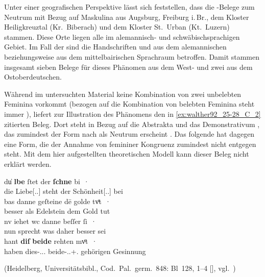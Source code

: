 Unter einer geografischen Perspektive lässt sich feststellen, dass die
-Belege zum Neutrum mit Bezug auf Maskulina aus Augsburg,
Freiburg i.\,Br., dem Kloster Heiligkreuztal (Kr.~Biberach) und dem Kloster
St.~Urban (Kt.~Luzern) stammen. Diese Orte liegen alle im alemannisch- und
schwäbischsprachigen Gebiet. Im Fall der \citet{kc} sind die Handschriften
\citet{kc:K} und \citet{kc:B1} aus dem alemannischen beziehungsweise aus dem
mittelbairischen Sprachraum betroffen. Damit stammen insgesamt sieben Belege
für dieses Phänomen aus dem West- und zwei aus dem Ost\-ober\-deutschen.

Während im untersuchten Material keine Kombination von zwei unbelebten Feminina
vorkommt (bezogen auf die Kombination von belebten Feminina steht immer
), liefert \citet[384]{paul2007} zur Illustration des Phänomens
den in \cref{ex:walther92_25-28_C_2} zitierten Beleg. Dort steht in Bezug auf
die Abstrakta   und   das
Demonstrativum  , das zumindest der Form nach als
Neutrum erscheint \autocite[485]{ksw2}. Das folgende  hat dagegen
eine Form, die der Annahme von femininer Kongruenz zumindest nicht entgegen
steht. Mit dem hier aufgestellten theoretischen Modell kann dieser Beleg nicht
erklärt werden.

\begin{exe}
\ex\label{ex:walther92_25-28_C_2}
	\gll du̍ \textbf{lbe} ſtet der \textbf{ſchne} bi~· \\
		die Liebe[\Nom.\Sg.\FemI] steht der Schönheit[\Dat.\Sg.\FemI] bei \\
\sn \gll bas danne geſteine dē golde tvͦt~· \\
		besser als Edelstein dem Gold tut \\
\sn \gll nv iehet wc danne beſſer ſi~· \\
		nun sprecht was daher besser sei \\
\sn \gll hant \textbf{diſ} \textbf{beide} rehten mvͦt~· \\
		haben dies-\Nom.\Pl.\NeutI{}.\St{} beide-\Nom.\Pl.\M+\F\subI.\St{} gehörigen Gesinnung \\
	\begin{taggedline}{(Heidelberg, Universitätsbibl., Cod.~Pal.~germ.~848: Bl~128\rb, 1--4 [\cite[4957]{hsc}], vgl.~\cite[356--358]{bein2013})}
	\trans {}
	\end{taggedline}
	\\
\end{exe}

